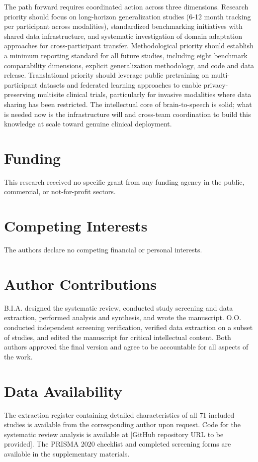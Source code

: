 \documentclass[11pt,a4paper]{article}
\begin{document}
The path forward requires coordinated action across three dimensions. Research priority should focus on long-horizon generalization studies (6-12 month tracking per participant across modalities), standardized benchmarking initiatives with shared data infrastructure, and systematic investigation of domain adaptation approaches for cross-participant transfer. Methodological priority should establish a minimum reporting standard for all future studies, including eight benchmark comparability dimensions, explicit generalization methodology, and code and data release. Translational priority should leverage public pretraining on multi-participant datasets and federated learning approaches to enable privacy-preserving multisite clinical trials, particularly for invasive modalities where data sharing has been restricted. The intellectual core of brain-to-speech is solid; what is needed now is the infrastructure will and cross-team coordination to build this knowledge at scale toward genuine clinical deployment.

\section*{Funding}
This research received no specific grant from any funding agency in the public, commercial, or not-for-profit sectors.

\section*{Competing Interests}
The authors declare no competing financial or personal interests.

\section*{Author Contributions}
B.I.A. designed the systematic review, conducted study screening and data extraction, performed analysis and synthesis, and wrote the manuscript. O.O. conducted independent screening verification, verified data extraction on a subset of studies, and edited the manuscript for critical intellectual content. Both authors approved the final version and agree to be accountable for all aspects of the work.

\section*{Data Availability}
The extraction register containing detailed characteristics of all 71 included studies is available from the corresponding author upon request. Code for the systematic review analysis is available at [GitHub repository URL to be provided]. The PRISMA 2020 checklist and completed screening forms are available in the supplementary materials.




\end{document}

